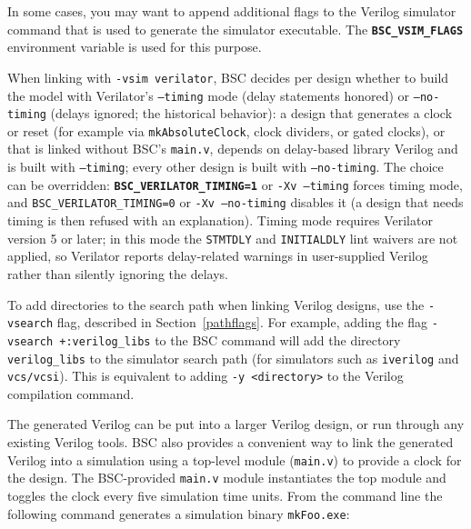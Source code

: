 \documentclass{article}
\newcommand{\te}[1]{\texttt{#1}}
\begin{document}
In some cases, you may want to append additional flags to the
Verilog simulator command that is used to generate the simulator
executable. The \textbf{\texttt{BSC\_VSIM\_FLAGS}} environment
variable is used for this purpose.

When linking with \texttt{-vsim verilator}, BSC decides per design
whether to build the model with Verilator's \texttt{--timing} mode
(delay statements honored) or \texttt{--no-timing} (delays ignored;
the historical behavior): a design that generates a clock or reset
(for example via \texttt{mkAbsoluteClock}, clock dividers, or gated
clocks), or that is linked without BSC's \te{main.v}, depends on
delay-based library Verilog and is built with \texttt{--timing};
every other design is built with \texttt{--no-timing}.  The choice
can be overridden: \textbf{\texttt{BSC\_VERILATOR\_TIMING=1}} or
\texttt{-Xv --timing} forces timing mode, and
\texttt{BSC\_VERILATOR\_TIMING=0} or \texttt{-Xv --no-timing}
disables it (a design that needs timing is then refused with an
explanation).  Timing mode requires Verilator version 5 or later; in
this mode the \texttt{STMTDLY} and \texttt{INITIALDLY} lint waivers
are not applied, so Verilator reports delay-related warnings in
user-supplied Verilog rather than silently ignoring the delays.

To add  directories to the search path when linking Verilog designs,
use the \te{-vsearch}\index{-vsearch@\te{-vsearch} (compiler flag)} flag,
described in Section~\ref{pathflags}.  For example, adding the flag \te{-vsearch
+:verilog\_libs} to the BSC command will add the directory
\te{verilog\_libs} to the simulator search path (for simulators such
as \te{iverilog} and \te{vcs/vcsi}).  This is equivalent to adding \te{-y
<directory>} to the Verilog compilation command.

The generated Verilog can be put into a larger Verilog design, or run
through any existing Verilog tools.  BSC also provides a
convenient way to link the generated Verilog into a simulation using  a
top-level module (\te{main.v}) to provide a clock for the design.  The
BSC-provided \te{main.v} module instantiates the top module
and toggles the clock every five simulation time units.
From the command line the following
command  generates a simulation binary \te{mkFoo.exe}:
\end{document}
